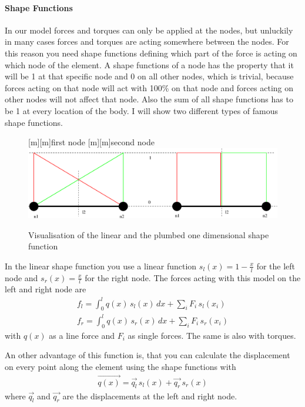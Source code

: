   \paragraph{Shape Functions} In our model forces and torques can only be applied at the nodes, but unluckily in many cases forces and torques are acting somewhere between the nodes. For this reason you need shape functions defining which part of the force is acting on which node of the element. A shape functions of a node has the property that it will be 1 at that specific node and 0 on all other nodes, which is trivial, because forces acting on that node will act with 100\% on that node and forces acting on other nodes will not affect that node. Also the sum of all shape functions has to be 1 at every location of the body. I will show two different types of famous shape functions.
\bigskip

\begin{figure}[!h]
\begin{center}
[m][m]{first node}
[m][m]{second node}
\includegraphics[scale=0.6]{shapeFunctions} 
\caption{Visualisation of the linear and the plumbed one dimensional shape function}
\label{shapeFunctions}
\end{center}
\end{figure}
In the linear shape function you use a linear function $s_l(x)=1-\frac{x}{l}$ for the left node and $s_r(x)=\frac{x}{l}$ for the right node. The forces acting with this model on the left and right node are
\begin{align}
f_l=\int_0^lq(x)\,s_l(x)\,dx+\sum_iF_i\,s_l(x_i) \nonumber \\
f_r=\int_0^lq(x)\,s_r(x)\,dx+\sum_iF_i\,s_r(x_i) \nonumber
\end{align}
with $q(x)$ as a line force and $F_i$ as single forces. The same is also with torques.
\bigskip

An other advantage of this function is, that you can calculate the displacement on every point along the element using the shape functions with
\begin{align}
\vec{q(x)}=\vec{q_l}\,s_l(x)+\vec{q_r}\,s_r(x)
\end{align}
where $\vec{q_l}$ and $\vec{q_r}$ are the displacements at the left and right node.
\bigskip

